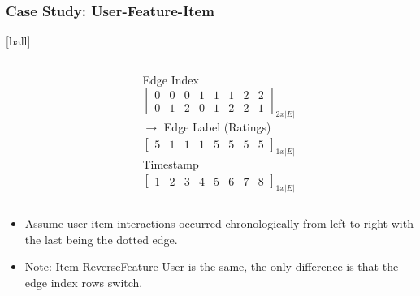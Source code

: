 \documentclass{beamer}
\begin{document}
\begin{frame}[fragile]
\frametitle{Case Study: User-Feature-Item}
[ball]

\begin{columns}
\begin{column}{0.5\textwidth}
\begin{minipage}[c]{1\textwidth}
    
\end{minipage}
\end{column}
\begin{column}{0.6\textwidth}
\hspace{2.5cm} Edge Index \\
\hspace{1cm} $\begin{bmatrix}
0 & 0 & 0 & 1 & 1 & 1 & 2 & 2 \\
0 & 1 & 2 & 0 & 1 & 2 & 2 & 1
\end{bmatrix}_{2x|E|}$ \\ \vspace{0.3cm}
$\to$ \hspace{1.4cm} Edge Label (Ratings) \\ 
\hspace{1cm} $\begin{bmatrix}
5 & 1 & 1 & 1 & 5 & 5 & 5 & 5 
\end{bmatrix}_{1x|E|}$ \\ \vspace{0.3cm}
\hspace{2.5cm} Timestamp \\ 
\hspace{1cm} $\begin{bmatrix}
1 & 2 & 3 & 4 & 5 & 6 & 7 & 8 
\end{bmatrix}_{1x|E|}$
\end{column}
\end{columns}

\vspace{1cm}

\begin{itemize}
    \item Assume user-item interactions occurred chronologically from left to right with the last being the dotted edge.

    \vspace{0.2cm}
    
    \item Note: Item-ReverseFeature-User is the same, the only difference is that the edge index rows switch.
\end{itemize}

\end{frame}
\end{document}
